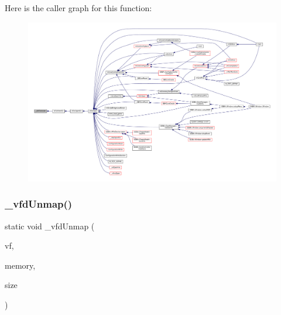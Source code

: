 Here is the caller graph for this function\+:
\nopagebreak
\begin{figure}[H]
\begin{center}
\leavevmode
\includegraphics[width=350pt]{vfs-fd_8c_a3ea37b047d1a73e301cc14c70f7e232e_icgraph}
\end{center}
\end{figure}
\mbox{\label{vfs-fd_8c_a4e580a8cc60f9640c03ed89a67da646d}} 
\subsubsection{\texorpdfstring{\+\_\+vfd\+Unmap()}{\_vfdUnmap()}}
{\footnotesize\ttfamily static void \+\_\+vfd\+Unmap (\begin{DoxyParamCaption}\item[{struct V\+File $\ast$}]{vf,  }\item[{void $\ast$}]{memory,  }\item[{size\+\_\+t}]{size }\end{DoxyParamCaption})\hspace{0.3cm}{\ttfamily [static]}}


